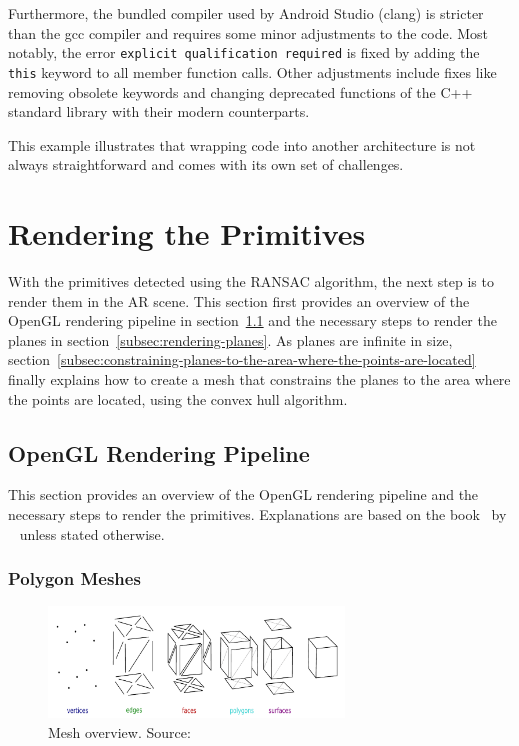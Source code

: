 Furthermore, the bundled compiler used by Android Studio (clang)
is stricter than the gcc compiler and requires some minor adjustments to the code.
Most notably, the error \texttt{explicit qualification required} is fixed by adding the
\texttt{this} keyword to all member function calls.
Other adjustments include fixes like removing obsolete keywords and changing deprecated
functions of the C++ standard library with their modern counterparts.

This example illustrates that wrapping code into another architecture is not always straightforward and comes with its
own set of challenges.


\section{Rendering the Primitives}\label{sec:rendering-the-primitives}
With the primitives detected using the RANSAC algorithm, the next step is to render them in the AR scene.
This section first provides an overview of the OpenGL rendering pipeline in section~\ref{subsec:opengl-rendering-pipeline}
and the necessary steps to render the planes in section~\ref{subsec:rendering-planes}.
As planes are infinite in size, section~\ref{subsec:constraining-planes-to-the-area-where-the-points-are-located}
finally explains how to create a mesh that constrains the planes to the area where the points are located,
using the convex hull algorithm.

\subsection{OpenGL Rendering Pipeline}\label{subsec:opengl-rendering-pipeline}
This section provides an overview of the OpenGL rendering pipeline and the necessary steps to render the primitives.
Explanations are based on the book~ by \citeauthor{de_vries_learn_2020}~\parencite{de_vries_learn_2020} unless stated otherwise.

\subsubsection{Polygon Meshes}\label{subsec:polygon-meshes}

\begin{figure}[h]
    \centering
    \includegraphics[width=0.70\textwidth]{images/Mesh_overview}
    \caption{Mesh overview. Source:~\cite{dorner_virtual_2019}}
    \label{fig:mesh-overview}
\end{figure}

